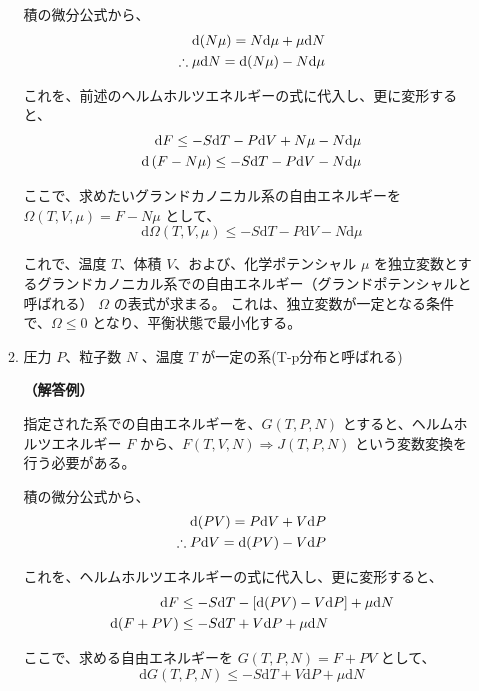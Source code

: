 \documentclass[uplatex,dvipdfmx,a4paper,11pt]{jsarticle}
\newcommand{\diff}{\mathrm d}
\begin{document}
\begin{enumerate}
\begin{enumerate}
積の微分公式から、
\begin{align*}
\diff (N \mu) = N \diff \mu + \mu \diff N \notag \\
\therefore \mu \diff N = \diff (N \mu) - N \diff \mu
\end{align*}
	 	
これを、前述のヘルムホルツエネルギーの式に代入し、更に変形すると、
\begin{align*}
\diff F \leq -S \diff T - P \diff V + N \mu - N \diff \mu \notag \\
\diff \left(F - N \mu \right) \leq -S \diff T - P \diff V - N \diff \mu
\end{align*}

ここで、求めたいグランドカノニカル系の自由エネルギーを $\Omega(T,V,\mu) = F - N \mu$ として、
\begin{equation*}
\diff \Omega(T,V,\mu) \leq -S \diff T - P \diff V - N \diff \mu
\end{equation*}
	 	
これで、温度 $T$、体積 $V$、および、化学ポテンシャル $\mu$ を独立変数とするグランドカノニカル系での自由エネルギー（グランドポテンシャルと呼ばれる） $\Omega$ の表式が求まる。
これは、独立変数が一定となる条件で、$\Omega \leq 0$ となり、平衡状態で最小化する。

\color{black}
\vspace{10pt}
\item
圧力 $P$、粒子数 $N$ 、温度 $T$ が一定の系(T-p分布と呼ばれる)



\vspace{10pt}
{\bf （解答例）}

指定された系での自由エネルギーを、$G(T, P, N)$ とすると、ヘルムホルツエネルギー $F$ から、$F(T, V, N) \Rightarrow J(T, P, N)$ という変数変換を行う必要がある。

積の微分公式から、
\begin{align*}
\diff (PV) = P \diff V + V \diff P \notag \\
\therefore  P \diff V = \diff (PV) - V \diff P
\end{align*}
	 	
これを、ヘルムホルツエネルギーの式に代入し、更に変形すると、
\begin{align*}
\diff F &\leq -S \diff T - [\diff (PV) -V \diff P] + \mu \diff N \notag \\
\diff (F + PV) &\leq -S \diff T + V \diff P + \mu \diff N
\end{align*}

ここで、求める自由エネルギーを $G(T,P,N) = F + PV$ として、
\begin{equation*}
\diff G(T,P,N) \leq -S \diff T + V \diff P + \mu \diff N
\end{equation*}
	 	

\end{enumerate}
\end{enumerate}
\end{document}
